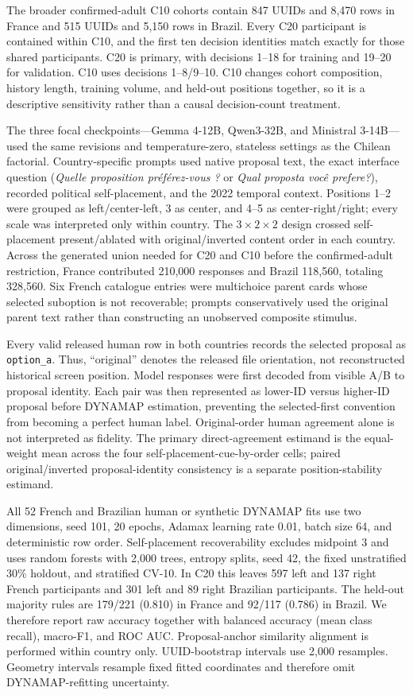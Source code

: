 \documentclass[unnumsec,webpdf,modern,large]{oup-authoring-template}
\begin{document}
The broader confirmed-adult C10 cohorts contain 847 UUIDs and 8,470 rows in France and 515 UUIDs and 5,150 rows in Brazil. Every C20 participant is contained within C10, and the first ten decision identities match exactly for those shared participants. C20 is primary, with decisions 1--18 for training and 19--20 for validation. C10 uses decisions 1--8/9--10. C10 changes cohort composition, history length, training volume, and held-out positions together, so it is a descriptive sensitivity rather than a causal decision-count treatment.

The three focal checkpoints---Gemma 4-12B, Qwen3-32B, and Ministral 3-14B---used the same revisions and temperature-zero, stateless settings as the Chilean factorial. Country-specific prompts used native proposal text, the exact interface question (\emph{Quelle proposition pr\'{e}f\'{e}rez-vous ?} or \emph{Qual proposta voc\^{e} prefere?}), recorded political self-placement, and the 2022 temporal context. Positions 1--2 were grouped as left/center-left, 3 as center, and 4--5 as center-right/right; every scale was interpreted only within country. The $3\times2\times2$ design crossed self-placement present/ablated with original/inverted content order in each country. Across the generated union needed for C20 and C10 before the confirmed-adult restriction, France contributed 210,000 responses and Brazil 118,560, totaling 328,560. Six French catalogue entries were multichoice parent cards whose selected suboption is not recoverable; prompts conservatively used the original parent text rather than constructing an unobserved composite stimulus.

Every valid released human row in both countries records the selected proposal as \texttt{option\_a}. Thus, ``original'' denotes the released file orientation, not reconstructed historical screen position. Model responses were first decoded from visible A/B to proposal identity. Each pair was then represented as lower-ID versus higher-ID proposal before DYNAMAP estimation, preventing the selected-first convention from becoming a perfect human label. Original-order human agreement alone is not interpreted as fidelity. The primary direct-agreement estimand is the equal-weight mean across the four self-placement-cue-by-order cells; paired original/inverted proposal-identity consistency is a separate position-stability estimand.

All 52 French and Brazilian human or synthetic DYNAMAP fits use two dimensions, seed 101, 20 epochs, Adamax learning rate 0.01, batch size 64, and deterministic row order. Self-placement recoverability excludes midpoint 3 and uses random forests with 2,000 trees, entropy splits, seed 42, the fixed unstratified 30\% holdout, and stratified CV-10. In C20 this leaves 597 left and 137 right French participants and 301 left and 89 right Brazilian participants. The held-out majority rules are 179/221 (0.810) in France and 92/117 (0.786) in Brazil. We therefore report raw accuracy together with balanced accuracy (mean class recall), macro-F1, and ROC AUC. Proposal-anchor similarity alignment is performed within country only. UUID-bootstrap intervals use 2,000 resamples. Geometry intervals resample fixed fitted coordinates and therefore omit DYNAMAP-refitting uncertainty.
\end{document}
